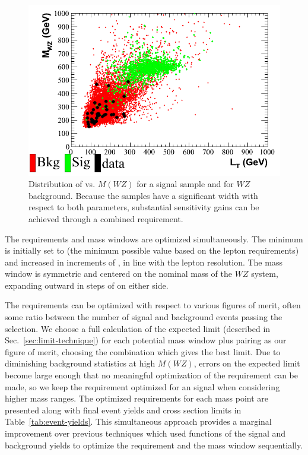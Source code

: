 \begin{figure}
  \centering
  \includegraphics[width=\plotwidth]{figures/plot-mass-vs-lt.png}
  \caption[Distribution of \lepht vs. $M(WZ)$ for a  \wprime signal sample and for $WZ$ background]{Distribution of \lepht vs. $M(WZ)$ for a  \wprime signal sample and for $WZ$ background.  Because the samples have a significant width with respect to both parameters, substantial sensitivity gains can be achieved through a combined requirement.}
  \label{fig:mass-vs-ht}
\end{figure}

The \lepht requirements and mass windows are optimized simultaneously.  The minimum \lepht is initially set to  (the minimum possible value based on the lepton \pt requirements) and increased in increments of , in line with the lepton \pt resolution.  The mass window is symmetric and centered on the nominal mass of the $WZ$ system, expanding outward in steps of  on either side.

The requirements can be optimized with respect to various figures of merit, often some ratio between the number of signal and background events passing the selection.  We choose a full calculation of the expected limit (described in Sec.~\ref{sec:limit-technique}) for each potential mass window plus \lepht pairing as our figure of merit, choosing the combination which gives the best limit.  Due to diminishing background statistics at high $M(WZ)$, errors on the expected limit become large enough that no meaningful optimization of the \lepht requirement can be made, so we keep the requirement optimized for an  signal when considering higher mass ranges.  The optimized requirements for each mass point are presented along with final event yields and cross section limits in Table~\ref{tab:event-yields}.  This simultaneous approach provides a marginal improvement over previous techniques which used functions of the signal and background yields to optimize the \lepht requirement and the mass window sequentially.

